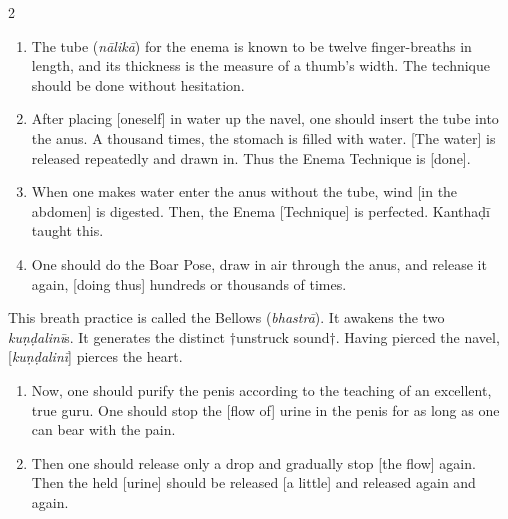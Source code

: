 \begin{nohyp}
\begin{multicols}{2}
\begin{eng}
\begin{enumerate}[nosep]
\itemsep=0pt
\item[12.] The tube (\textit{nālikā}) for the enema is known to be twelve finger-breaths in length, and its thickness is the measure of a thumb’s width.  The technique should be done without hesitation.
\item[13.] After placing [oneself] in water up the navel, one should insert the tube into the anus. A thousand times, the stomach is filled with water. [The water] is released repeatedly and drawn in. Thus the Enema Technique is [done]. 
\item[14.] When one makes water enter the anus without the tube, wind [in the abdomen] is digested. Then, the Enema [Technique] is perfected. Kanthaḍī taught this.
\item[15.] One should do the Boar Pose, draw in air through the anus, and release it again, [doing thus] hundreds or thousands of times.
\end{enumerate}
This breath practice is called the Bellows (\emph{bhastrā}). It awakens the two \textit{kuṇḍalinī}s. It generates the distinct $\dagger$unstruck sound$\dagger$. Having pierced the navel, [\textit{kuṇḍalinī}] pierces the heart.
\vskip 7pt


\begin{enumerate}[nosep]
\itemsep=0pt
\item[16.] Now, one should purify the penis according to the teaching of an excellent, true guru. One should stop the [flow of] urine in the penis for as long as one can bear with the pain.
\item[17.] Then one should release only a drop and gradually stop [the flow] again. Then the held [urine] should be released [a little] and released again and again.
\end{enumerate}

\end{eng}
\end{multicols}
\end{nohyp}

